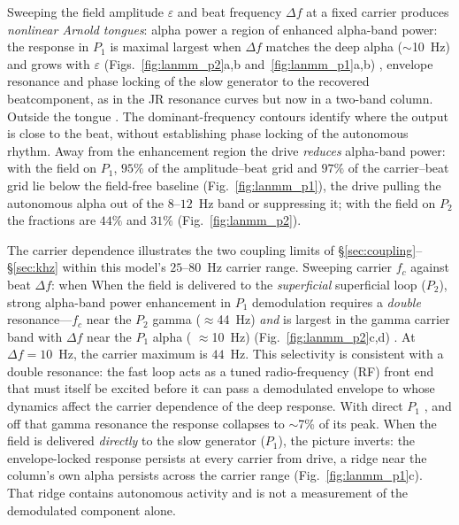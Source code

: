 \documentclass[11pt,a4paper]{article}
\providecommand{\DIFaddtex}[1]{{\protect\color{blue} \sf #1}} %
\providecommand{\DIFdeltex}[1]{{\protect\color{red} \scriptsize #1}} %
\providecommand{\DIFaddbegin}{} %
\providecommand{\DIFaddend}{} %
\providecommand{\DIFdelbegin}{} %
\providecommand{\DIFdelend}{} %
\providecommand{\DIFadd}[1]{\texorpdfstring{\DIFaddtex{#1}}{#1}} %
\providecommand{\DIFdel}[1]{\texorpdfstring{\DIFdeltex{#1}}{}} %
\begin{document}
Sweeping the field amplitude $\varepsilon$ and beat frequency $\Delta f$ at a fixed
carrier produces \DIFdelbegin \DIFdel{\emph{nonlinear Arnold tongues}: alpha power}\DIFdelend \DIFaddbegin \DIFadd{a region of enhanced alpha-band power: the response }\DIFaddend in $P_1$ is \DIFdelbegin \DIFdel{maximal
}\DIFdelend \DIFaddbegin \DIFadd{largest
}\DIFaddend when $\Delta f$ matches the deep alpha ($\sim$10~Hz) and grows with $\varepsilon$
(Figs.~\ref{fig:lanmm_p2}a,b and~\ref{fig:lanmm_p1}a,b)\DIFdelbegin \DIFdel{, envelope resonance and
phase locking of the slow generator to the recovered beatcomponent, as in the JR resonance curves but now in a two-band column. Outside the tongue }\DIFdelend \DIFaddbegin \DIFadd{. The dominant-frequency
contours identify where the output is close to the beat, without establishing
phase locking of the autonomous rhythm. Away from the enhancement region }\DIFaddend the drive
\emph{reduces} alpha-band power: with the field on $P_1$, $95\%$ of the amplitude--beat
grid and $97\%$ of the carrier--beat grid lie below the field-free baseline
(Fig.~\ref{fig:lanmm_p1}), the drive pulling the autonomous alpha out of the $8$--$12$~Hz
band or suppressing it; with the field on $P_2$ the fractions are $44\%$ and $31\%$
(Fig.~\ref{fig:lanmm_p2}).

The carrier dependence illustrates the two coupling limits of
\S\ref{sec:coupling}--\S\ref{sec:khz} within this model's $25$--$80$~Hz carrier
range. \DIFdelbegin \DIFdel{Sweeping carrier $f_c$ against
beat $\Delta f$: when }\DIFdelend \DIFaddbegin \DIFadd{When }\DIFaddend the field is delivered to the \DIFdelbegin \DIFdel{\emph{superficial} }\DIFdelend \DIFaddbegin \DIFadd{superficial }\DIFaddend loop ($P_2$), \DIFdelbegin \DIFdel{strong }\DIFdelend \DIFaddbegin \DIFadd{alpha-band
power enhancement in }\DIFaddend $P_1$ \DIFdelbegin \DIFdel{demodulation requires a \emph{double} resonance---$f_c$ near
the $P_2$ gamma ($\approx$44~Hz) \emph{and} }\DIFdelend \DIFaddbegin \DIFadd{is largest in the gamma carrier band with
}\DIFaddend $\Delta f$ near the $P_1$ alpha (\DIFdelbegin \DIFdel{$\approx$10~Hz) (}\DIFdelend Fig.~\ref{fig:lanmm_p2}c,d)\DIFaddbegin \DIFadd{. At
$\Delta f=10$~Hz, the carrier maximum is $44$~Hz. This selectivity is consistent with a double
resonance}\DIFaddend : the fast loop acts as a tuned
radio-frequency (RF) front end \DIFdelbegin \DIFdel{that must itself be excited before it can pass a demodulated
envelope to }\DIFdelend \DIFaddbegin \DIFadd{whose dynamics affect the carrier dependence of
the deep response. With direct }\DIFaddend $P_1$ \DIFdelbegin \DIFdel{, and off that gamma resonance the response collapses to
$\sim$7\% of its peak.
When the field is delivered \emph{directly} to the slow
generator ($P_1$), the picture inverts: the envelope-locked response persists at
every carrier from }\DIFdelend \DIFaddbegin \DIFadd{drive, a ridge near the column's own alpha
persists across the carrier range (Fig.~\ref{fig:lanmm_p1}c). That ridge contains
autonomous activity and is not a measurement of the demodulated component alone.
}
\end{document}
